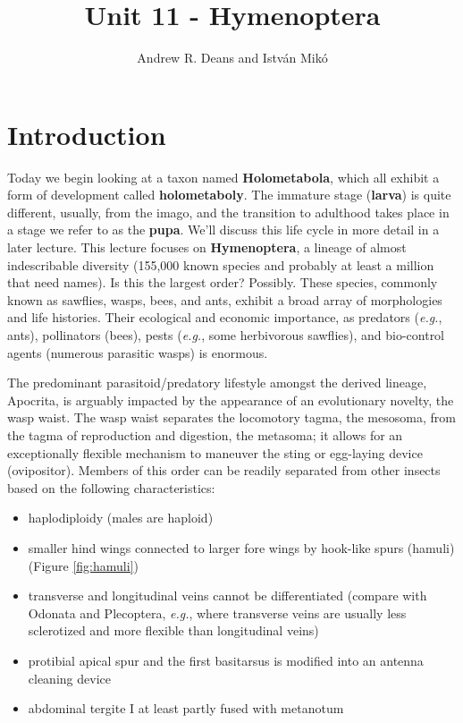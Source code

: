 \documentclass[letterpaper, 11pt]{article}
\title{Unit 11 - Hymenoptera}
\author{Andrew R. Deans and Istv\'an Mik\'o}
\begin{document}
\cleanlookdateon %
\maketitle
\thispagestyle{fancy}
\section*{Introduction}
Today we begin looking at a taxon named \textbf{Holometabola}, which all exhibit a form of development called \textbf{holometaboly}. The immature stage (\textbf{larva}) is quite different, usually, from the imago, and the transition to adulthood takes place in a stage we refer to as the \textbf{pupa}. We'll discuss this life cycle in more detail in a later lecture. This lecture focuses on \textbf{Hymenoptera}, a lineage of almost indescribable diversity (155,000 known species and probably at least a million that need names). Is this the largest order? Possibly. These species, commonly known as sawflies, wasps, bees, and ants, exhibit a broad array of morphologies and life histories. Their ecological and economic importance, as predators (\textit{e.g.}, ants), pollinators (bees), pests (\textit{e.g.}, some herbivorous sawflies), and bio-control agents (numerous parasitic wasps) is enormous. 

The predominant parasitoid/predatory lifestyle amongst the derived lineage, Apocrita, is arguably impacted by the appearance of an evolutionary novelty, the wasp waist. The wasp waist separates the locomotory tagma, the mesosoma, from the tagma of reproduction and digestion, the metasoma; it allows for an exceptionally flexible mechanism to maneuver the sting or egg-laying device (ovipositor). Members of this order can be readily separated from other insects based on the following characteristics:

\begin{itemize}
\item haplodiploidy (males are haploid)
\item smaller hind wings connected to larger fore wings by hook-like spurs (hamuli) (Figure \ref{fig:hamuli})
\item transverse and longitudinal veins cannot be differentiated (compare with Odonata and Plecoptera, \textit{e.g.}, where transverse veins are usually less sclerotized and more flexible than longitudinal veins)
\item protibial apical spur and the first basitarsus is modified into an antenna cleaning device
\item abdominal tergite I at least partly fused with metanotum
\end{itemize}
\end{document}
